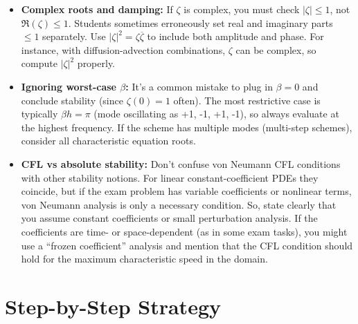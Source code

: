 \documentclass[a4paper,11pt]{report}
\begin{document}
\begin{pitfalls}{}{}
    \begin{itemize}
        \item \textbf{Complex roots and damping:} If $\zeta$ is complex, you must check $|\zeta| \le 1$, not $\Re(\zeta) \le 1$. Students sometimes erroneously set real and imaginary parts $\le 1$ separately. Use $|\zeta|^2 = \zeta \overline{\zeta}$ to include both amplitude and phase. For instance, with diffusion-advection combinations, $\zeta$ can be complex, so compute $|\zeta|^2$ properly.
        \item \textbf{Ignoring worst-case $\beta$:} It's a common mistake to plug in $\beta=0$ and conclude stability (since $\zeta(0)=1$ often). The most restrictive case is typically $\beta h = \pi$ (mode oscillating as +1, -1, +1, -1), so always evaluate at the highest frequency. If the scheme has multiple modes (multi-step schemes), consider all characteristic equation roots.
        \item \textbf{CFL vs absolute stability:} Don't confuse von Neumann CFL conditions with other stability notions. For linear constant-coefficient PDEs they coincide, but if the exam problem has variable coefficients or nonlinear terms, von Neumann analysis is only a necessary condition. So, state clearly that you assume constant coefficients or small perturbation analysis. If the coefficients are time- or space-dependent (as in some exam tasks), you might use a ``frozen coefficient'' analysis and mention that the CFL condition should hold for the maximum characteristic speed in the domain.
    \end{itemize}
\end{pitfalls}
\clearpage
\section{Step-by-Step Strategy}
\end{document}
